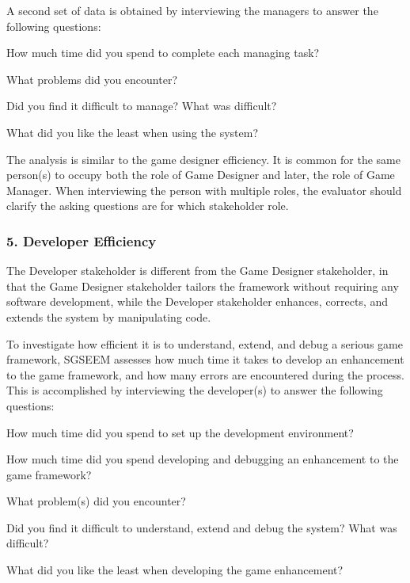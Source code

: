 \documentclass{sigchi}
\begin{document}
A second set of data is obtained by interviewing the managers to answer the following
questions:

\begin{compactitem}
\item How much time did you spend to complete each managing task?
\item What problems did you encounter?
\item Did you find it difficult to manage? What was difficult?
\item What did you like the least when using the system?
\end{compactitem}

The analysis is similar to the game designer efficiency. It is common for the same
person(s) to occupy both the role of Game Designer and later, the role of Game Manager.
When interviewing the person with multiple roles, the
evaluator should clarify the asking questions are for which stakeholder role.

\subsubsection{5. Developer Efficiency}

The Developer stakeholder is different from the Game Designer stakeholder, in that the
Game Designer stakeholder tailors the framework without requiring any software
development, while the Developer stakeholder enhances, corrects, and extends the system by
manipulating code. 

To investigate how efficient it is to understand, extend, and debug a serious game
framework, SGSEEM assesses how much time it takes to develop an
enhancement to the game framework, and how many errors are encountered
during the process. This is accomplished by interviewing the developer(s) to
answer the following questions:

\begin{compactitem}
\item How much time did you spend to set up the development
  environment?
\item How much time did you spend developing and debugging an
  enhancement to the game framework?
\item What problem(s) did you encounter?
\item Did you find it difficult to understand, extend and debug the
  system? What was difficult?
\item What did you like the least when developing the game
  enhancement? 
\end{compactitem}
\end{document}
